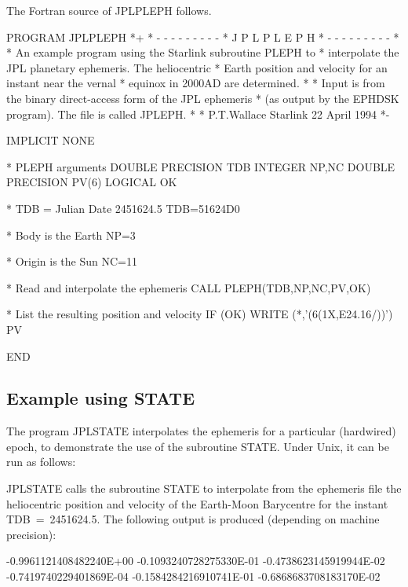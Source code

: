 \documentclass[twoside,11pt,nolof]{starlink}
\begin{document}
The Fortran source of JPLPLEPH follows.

\begin{small}
\begin{terminalv}
      PROGRAM JPLPLEPH
*+
*  - - - - - - - - -
*   J P L P L E P H
*  - - - - - - - - -
*
*  An example program using the Starlink subroutine PLEPH to
*  interpolate the JPL planetary ephemeris.  The heliocentric
*  Earth position and velocity for an instant near the vernal
*  equinox in 2000AD are determined.
*
*  Input is from the binary direct-access form of the JPL ephemeris
*  (as output by the EPHDSK program).  The file is called JPLEPH.
*
*  P.T.Wallace   Starlink   22 April 1994
*-

      IMPLICIT NONE

*  PLEPH arguments
      DOUBLE PRECISION TDB
      INTEGER NP,NC
      DOUBLE PRECISION PV(6)
      LOGICAL OK

*  TDB = Julian Date 2451624.5
      TDB=51624D0

*  Body is the Earth
      NP=3

*  Origin is the Sun
      NC=11

*  Read and interpolate the ephemeris
      CALL PLEPH(TDB,NP,NC,PV,OK)

*  List the resulting position and velocity
      IF (OK) WRITE (*,'(6(1X,E24.16/))') PV

      END
\end{terminalv}
\end{small}

\subsection{Example using STATE}
\label{example_using_state}

The program JPLSTATE interpolates the ephemeris for a particular
(hardwired) epoch, to demonstrate the use of the subroutine STATE.
Under Unix, it can be run as follows:

\begin{terminalv}
\end{terminalv}

JPLSTATE calls the subroutine STATE to interpolate from the ephemeris file
the heliocentric position and velocity of the Earth-Moon Barycentre for
the instant TDB~=~2451624.5. The following output is produced (depending
on machine precision):

\begin{terminalv}
-0.9961121408482240E+00
-0.1093240728275330E-01
-0.4738623145919944E-02
-0.7419740229401869E-04
-0.1584284216910741E-01
-0.6868683708183170E-02
\end{terminalv}
\end{document}
